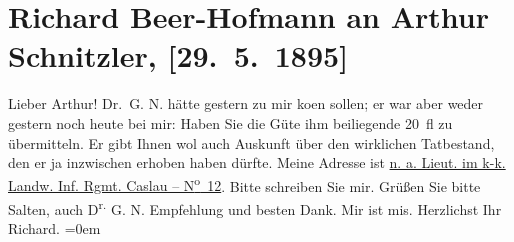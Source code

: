 

         
         \renewcommand{\erwaehntePersonen}{Personen: Richard Beer-Hofmann, Gabor Nobl, Felix Salten}
         \renewcommand{\erwaehnteOrte}{Orte: Caslau, Wien}
         \renewcommand{\erwaehnteWerke}{}
               \section[Richard Beer-Hofmann an Arthur Schnitzler, {[}29. 5. 1895{]}]{ Richard Beer-Hofmann an Arthur Schnitzler, {[}29. 5. 1895{]}}\nopagebreak{}\rehead{ }\begin{ledgroupsized}[t]{13cm}\normalsize\beginnumbering{} \toendnotes[C]{\smallbreak\pagebreak[2]} 
\pstart
           \noindent{}{\pb}Lieber Arthur! Dr. G. N. hätte
               gestern zu mir ko{\geminationm}en sollen; er war aber weder gestern
               noch heute bei mir: Haben Sie die Güte ihm beiliegende 20 fl zu übermitteln. Er gibt
               Ihnen wol auch Auskunft über den wirklichen Tatbestand, den er ja inzwischen erhoben
                  {\pb}haben dürfte. Meine Adresse
               ist\pend
           \pstart
           \uline{n. a. Lieut. im k-k. Landw. Inf. Rgmt. Caslau – N\textsuperscript{o} 12}. Bitte
               schreiben Sie mir. Grüßen Sie bitte Salten,
               auch D\textsuperscript{r.}{ }G. N. Empfehlung und besten Dank.\pend
           \pstart
           {\pb}Mir ist mis.\pend
           \pstart
           Herzlichst Ihr{\\[\baselineskip]}\spacefill\mbox{Richard.}\pend
           \leftskip=0em{}
         
         \endnumbering{}\end{ledgroupsized}  \newcommand{\dateiname}{L00446}\newcommand{\titel}{Richard Beer-Hofmann an Arthur Schnitzler, [29. 5. 1895]}\newcommand{\editorInnen}{Martin Anton Müller und Gerd-Hermann Susen}
      
